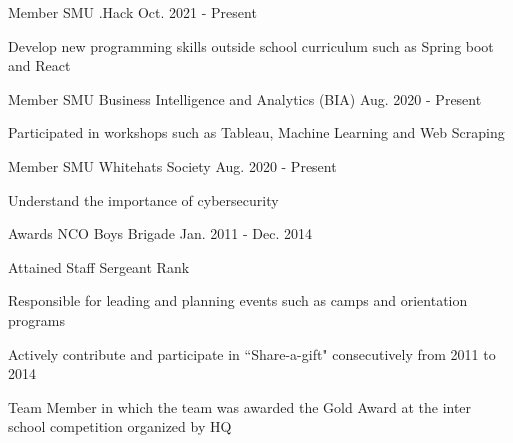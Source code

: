 

\begin{cventries}

    \cventry
    {Member} %
    {SMU .Hack} %
    {Oct. 2021 - Present} %
    {} 
    {
      \begin{cvitems} %
        \item {Develop new programming skills outside school curriculum such as Spring boot and React}
      \end{cvitems}
    }
    
    \cventry
    {Member} %
    {SMU Business Intelligence and Analytics (BIA)} %
    {Aug. 2020 - Present} %
    {} 
    {
      \begin{cvitems} %
        \item {Participated in workshops such as Tableau, Machine Learning and Web Scraping}
      \end{cvitems}
    }

    \cventry
    {Member} %
    {SMU Whitehats Society} %
    {Aug. 2020 - Present} %
    {} 
    {
      \begin{cvitems} %
        \item {Understand the importance of cybersecurity}
      \end{cvitems}
    }

    \cventry
    {Awards NCO} %
    {Boys Brigade} %
    {Jan. 2011 - Dec. 2014} %
    {} 
    {
      \begin{cvitems} %
        \item {Attained Staff Sergeant Rank}
        \item {Responsible for leading and planning events such as camps and orientation programs}
        \item {Actively contribute and participate in “Share-a-gift" consecutively from 2011 to 2014}
        \item {Team Member in which the team was awarded the Gold Award at the inter school competition organized by HQ}
      \end{cvitems}
    }

\end{cventries}
